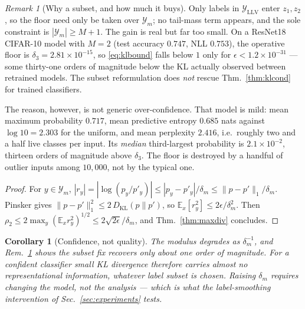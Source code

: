 \documentclass[10pt,letterpaper,twocolumn]{article}
\newcommand{\Y}{\mathcal{Y}}
\theoremstyle{plain}
\newtheorem{corollary}[theorem]{Corollary}
\theoremstyle{definition}
\theoremstyle{remark}
\newtheorem{remark}[theorem]{Remark}
\begin{document}
\begin{remark}[Why a subset, and how much it buys]
\label{rem:subset}
Only labels in $\mathcal{Y}_{\mathrm{LLV}}$ enter $z_{1},z_{2}$, so the floor
need only be taken over $\Y_{m}$; no tail-mass term appears, and the sole
constraint is $|\Y_{m}|\ge M+1$. The gain is real but far too small. On a
ResNet18 CIFAR-10 model with $M=2$ (test accuracy $0.747$, NLL $0.753$), the
operative floor is $\delta_{3}=2.81\times10^{-15}$, so \eqref{eq:klbound} falls
below $1$ only for $\epsilon<1.2\times10^{-31}$ --- some thirty-one orders of
magnitude below the KL actually observed between retrained models. The subset
reformulation does \emph{not} rescue Thm.~\ref{thm:klcond} for trained
classifiers.

The reason, however, is not generic over-confidence. That model is mild: mean
maximum probability $0.717$, mean predictive entropy $0.685$ nats against
$\log10=2.303$ for the uniform, and mean perplexity $2.416$, i.e.\ roughly two
and a half live classes per input. Its \emph{median} third-largest probability
is $2.1\times10^{-2}$, thirteen orders of magnitude above $\delta_{3}$. The
floor is destroyed by a handful of outlier inputs among $10{,}000$, not by the
typical one.\end{remark}

\begin{proof}
For $y\in\Y_{m}$, $|r_{y}|=|\log(p_{y}/p'_{y})|\le|p_{y}-p'_{y}|/\delta_{m}
\le\|p-p'\|_{1}/\delta_{m}$. Pinsker gives
$\|p-p'\|_{1}^{2}\le2\,D_{\mathrm{KL}}(p\|p')$, so
$\mathbb{E}_{x}[r_{y}^{2}]\le2\epsilon/\delta_{m}^{2}$. Then
$\rho_{2}\le2\max_{y}(\mathbb{E}_{x}r_{y}^{2})^{1/2}\le2\sqrt{2\epsilon}/\delta_{m}$,
and Thm.~\ref{thm:maxdiv} concludes.
\end{proof}

\begin{corollary}[Confidence, not quality]
\label{cor:conf}
The modulus degrades as $\delta_{m}^{-1}$, and Rem.~\ref{rem:subset} shows the
subset fix recovers only about one order of magnitude. For a confident
classifier small KL divergence therefore carries almost no representational
information, whatever label subset is chosen. Raising $\delta_{m}$ requires
changing the model, not the analysis --- which is what the label-smoothing
intervention of Sec.~\ref{sec:experiments} tests.
\end{corollary}
\end{document}
